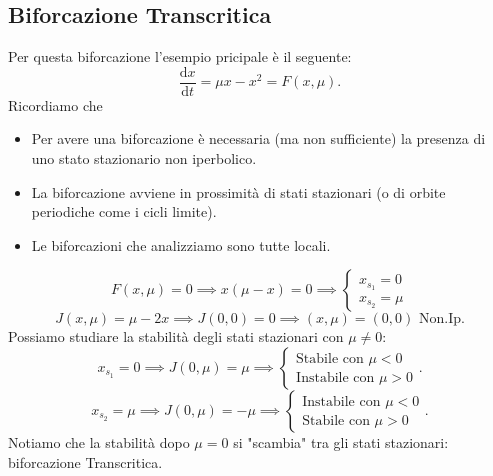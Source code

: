 \subsection{Biforcazione Transcritica}%
Per questa biforcazione l'esempio pricipale è il seguente:
\[
    \frac{\text{d} x}{\text{d} t} = \mu x - x^2 = F(x, \mu) 
.\] 
Ricordiamo che 
\begin{itemize}
    \item Per avere una biforcazione è necessaria (ma non sufficiente) la presenza di uno stato stazionario non iperbolico.
    \item La biforcazione avviene in prossimità di stati stazionari (o di orbite periodiche come i cicli limite).
    \item Le biforcazioni che analizziamo sono tutte locali.
\end{itemize}
\[
    F(x, \mu) = 0 \implies  x(\mu-x) = 0 \implies  
    \begin{cases}
        x_{s_1}= 0\\
	x_{s_2}= \mu
    \end{cases}
\] 
\[
    J(x, \mu) = \mu-2x \implies J(0, 0) = 0 \implies  (x, \mu) = (0, 0) \text{ Non.Ip.}
\] 
Possiamo studiare la stabilità degli stati stazionari con $\mu\neq 0$:
\[
    x_{s_1}=0\implies  J(0, \mu) = \mu \implies 
    \begin{cases}
        \text{Stabile con }\mu <0\\
	\text{Instabile con }\mu >0
    \end{cases}
.\] 
\[
    x_{s_2}=\mu\implies  J(0, \mu) = -\mu \implies 
    \begin{cases}
        \text{Instabile con }\mu <0\\
	\text{Stabile con }\mu >0
    \end{cases}
.\] 
Notiamo che la stabilità dopo $\mu=0$ si "scambia" tra gli stati stazionari: biforcazione Transcritica.

